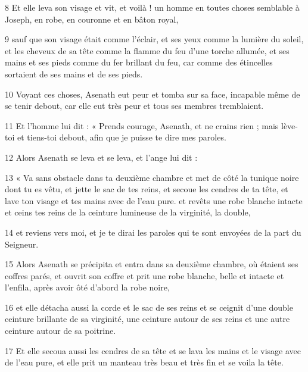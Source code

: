 \par 8 Et elle leva son visage et vit, et voilà ! un homme en toutes choses semblable à Joseph, en robe, en couronne et en bâton royal,

\par 9 sauf que son visage était comme l'éclair, et ses yeux comme la lumière du soleil, et les cheveux de sa tête comme la flamme du feu d'une torche allumée, et ses mains et ses pieds comme du fer brillant du feu, car comme des étincelles sortaient de ses mains et de ses pieds.

\par 10 Voyant ces choses, Asenath eut peur et tomba sur sa face, incapable même de se tenir debout, car elle eut très peur et tous ses membres tremblaient.

\par 11 Et l'homme lui dit : « Prends courage, Asenath, et ne crains rien ; mais lève-toi et tiens-toi debout, afin que je puisse te dire mes paroles.

\par 12 Alors Asenath se leva et se leva, et l'ange lui dit :

\par 13 « Va sans obstacle dans ta deuxième chambre et met de côté la tunique noire dont tu es vêtu, et jette le sac de tes reins, et secoue les cendres de ta tête, et lave ton visage et tes mains avec de l'eau pure. et revêts une robe blanche intacte et ceins tes reins de la ceinture lumineuse de la virginité, la double,

\par 14 et reviens vers moi, et je te dirai les paroles qui te sont envoyées de la part du Seigneur.

\par 15 Alors Asenath se précipita et entra dans sa deuxième chambre, où étaient ses coffres parés, et ouvrit son coffre et prit une robe blanche, belle et intacte et l'enfila, après avoir ôté d'abord la robe noire,

\par 16 et elle détacha aussi la corde et le sac de ses reins et se ceignit d'une double ceinture brillante de sa virginité, une ceinture autour de ses reins et une autre ceinture autour de sa poitrine.

\par 17 Et elle secoua aussi les cendres de sa tête et se lava les mains et le visage avec de l'eau pure, et elle prit un manteau très beau et très fin et se voila la tête.

